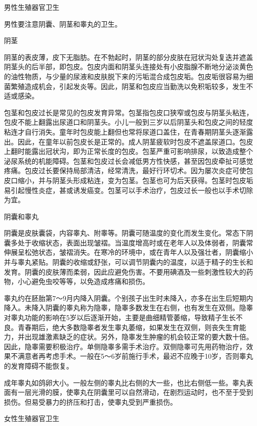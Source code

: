 \documentclass[12pt,UTF8]{ctexbook}
\begin{document}
男性生殖器官卫生


男性要注意阴囊、阴茎和睾丸的卫生。

阴茎

阴茎的表皮薄，皮下无脂肪。在不勃起时，阴茎的部分皮肤在冠状沟处复迭并遮盖阴茎头的后半部，即包皮。包皮内面和阴茎头连接处有小皮脂腺不断地分泌淡黄色的油性物质，与少量的尿液和皮肤脱下来的污垢混合成包皮垢。包皮垢很容易为细菌繁殖造成机会，引起发炎等。因此，阴茎和包皮应当勤洗以免积垢较多，发生不适或感染。

包茎和包皮过长是常见的包皮发育异常。包茎指包皮口狭窄或包皮与阴茎头粘连，包皮不能上翻露出尿道口和阴茎头。小儿一般到三岁以后阴茎头和包皮之间的轻度粘连才自行消失。童年时包皮能上翻但也常将尿道口盖住，在青春期阴茎头逐渐露出。因此，在童年以前包皮长是正常的。成人阴茎疲软时包皮不遮盖尿道口。包皮上翻时能露出冠状沟，即为正常长度的包皮。包茎严重可影响排尿，以致造成整个泌尿系统的机能障碍。包茎和包皮过长会减低男方性快感，甚至因包皮牵扯可感觉疼痛。包皮过长要保持局部清洁，经常清洗，最好行环切术。因为屡次炎症可使包皮口缩小，并与阴茎头形成粘连，变为包茎。包茎也可为后天获得。包茎时包皮垢易引起慢性炎症，甚或诱发癌变。包茎可以手术治疗，包皮过长一般也以手术切除为宜。

阴囊和睾丸

阴囊是皮肤囊袋，内容睾丸、附睾等。阴囊可随温度的变化而发生变化。常态下阴囊多处于收缩状态，表面出现皱褶。当温度增高时或在老年人以及体弱者，阴囊常伸展呈松弛状态，皱褶消失。在寒冷的环境中，或在青年人以及强壮者，阴囊缩小并与睾丸紧贴。阴囊的收缩或舒张，可以调节阴囊内的温度，以适于精子的生长和发育。阴囊的皮肤薄而柔弱，因此应避免伤害。不要用碘酒及一些刺激性较大的药物，小心避免虫咬等等，以免造成疼痛和损伤。

睾丸约在胚胎第7～9月内降入阴囊。个别孩子出生时未降入，亦多在出生后短期内降入。未降入阴囊的睾丸称为隐睾，隐睾多数发生在右侧，也有发生在双侧。隐睾对睾丸功能的影响在5岁以后逐渐开始，主要是曲细精管萎缩，导致精子生长不良。青春期后，绝大多数隐睾者发生睾丸萎缩，如果发生在双侧，则丧失生育能力，并出现雄激素缺乏的症状。另外，隐睾发生肿瘤的机会较正常的要大数十倍。因此，隐睾需要积极治疗。单侧隐睾多需手术治疗。双侧隐睾可先用药物治疗，效果不满意者再考虑手术。一般在5～6岁前施行手术，最迟不应晚于10岁，否则睾丸的发育障碍不能恢复。

成年睾丸如鸽卵大小。一般左侧的睾丸比右侧的大一些，也比右侧低一些。睾丸表面有一层光滑的膜，使睾丸在阴囊里可以自然滑动，在剧烈运动时，也不至于受到损伤。但易受暴力的挤压和打击，使睾丸受到严重损伤。





女性生殖器官卫生
\end{document}
